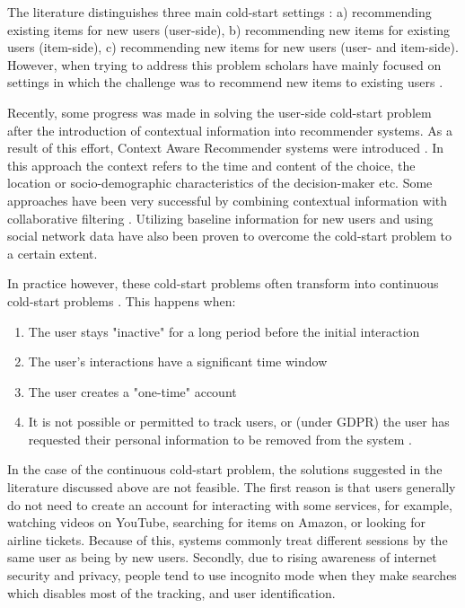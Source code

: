 \documentclass[a4paper,12pt]{article}
\begin{document}
The literature distinguishes three main cold-start settings \citep{park2009pairwise}: a) recommending existing items for new users (user-side), b) recommending new items for existing users (item-side), c) recommending new items for new users (user- and item-side). However, when trying to address this problem scholars have mainly focused on settings in which the challenge was to recommend new items to existing users \citep{zhang2010solving}.

Recently, some progress was made in solving the user-side cold-start problem after the introduction of contextual information into recommender systems. As a result of this effort, Context Aware Recommender systems were introduced \citep{adomavicius2011context}. In this approach the context refers to the time and content of the choice, the location or socio-demographic characteristics of the decision-maker etc.  Some approaches have been very successful by combining contextual information with collaborative filtering \citep{aharon2013off,bykau2013coping,saveski2014item}. Utilizing baseline information for new users \citep{kluver2014evaluating} and using social network data \citep{guy2009personalized} have also been proven to overcome the cold-start problem to a certain extent.

In practice however, these cold-start problems often transform into continuous cold-start problems \citep{kiseleva2016beyond}. This happens when:
\begin{enumerate}
    \item The user stays "inactive" for a long period before the initial interaction
    \item The user's interactions have a significant time window
    \item The user creates a "one-time" account
    \item It is not possible or permitted to track users, or (under GDPR) the user has requested their personal information to be removed from the system \citep{hildebrandt2022issue}.
\end{enumerate}

In the case of the continuous cold-start problem, the solutions suggested in the literature discussed above are not feasible. The first reason is that users generally do not need to create an account for interacting with some services, for example,  watching videos on YouTube, searching for items on Amazon, or looking for airline tickets. Because of this, systems commonly treat different sessions by the same user as being by new users. Secondly, due to rising awareness of internet security and privacy, people tend to use incognito mode when they make searches \citep{anton2010internet} which disables most of the tracking, and user identification.
\end{document}
